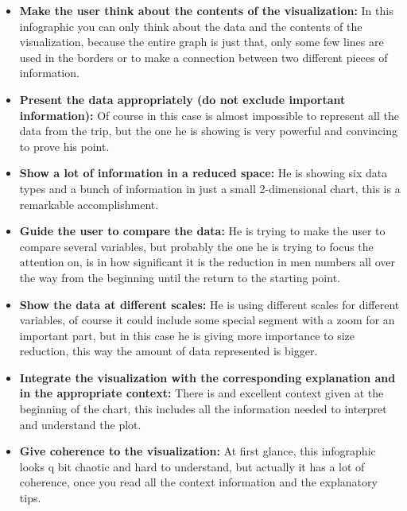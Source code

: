 \documentclass{article}
\begin{document}
\begin{description}
\begin{itemize}
      \item \textbf{Make the user think about the contents of the visualization:}
        In this infographic you can only think about the data and the contents of the visualization, because the entire graph is just that, only some few lines are used in the borders or to make a connection between two different pieces of information.
      \item \textbf{Present the data appropriately (do not exclude important information):} Of course in this case is almost impossible to represent all the data from the trip, but the one he is showing is very powerful and convincing to prove his point.
      \item \textbf{Show a lot of information in a reduced space:} He is showing six data types and a bunch of information in just a small 2-dimensional chart, this is a remarkable accomplishment.
      \item \textbf{Guide the user to compare the data:} He is trying to make the user to compare several variables, but probably the one he is trying to focus the attention on, is in how significant it is the reduction in men numbers all over the way from the beginning until the return to the starting point.
      \item \textbf{Show the data at different scales:} He is using different scales for different variables, of course it could include some special segment with a zoom for an important part, but in this case he is giving more importance to size reduction, this way the amount of data represented is bigger.
      \item \textbf{Integrate the visualization with the corresponding explanation and in the appropriate context:} There is and excellent context given at the beginning of the chart, this includes all the information needed to interpret and understand the plot.
      \item \textbf{Give coherence to the visualization:} At first glance, this infographic looks q bit chaotic and hard to understand, but actually it has a lot of coherence, once you read all the context information and the explanatory tips.
    \end{itemize}


\end{description}
\end{document}
